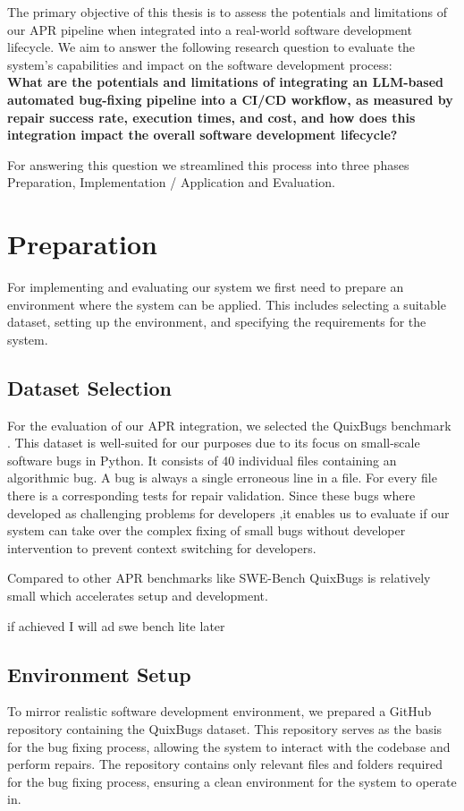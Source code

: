 The primary objective of this thesis is to assess the potentials and limitations of our APR pipeline when integrated into a real-world software development lifecycle. We aim to answer the following research question to evaluate the system's capabilities and impact on the software development process: \\
\textbf{What are the potentials and limitations of integrating an LLM-based automated bug-fixing pipeline into a CI/CD workflow, as measured by repair success rate, execution times, and cost, and how does this integration impact the overall software development lifecycle?}

For answering this question we streamlined this process into three phases Preparation, Implementation / Application and Evaluation.



\section{Preparation}
For implementing and evaluating our system we first need to prepare an environment where the system can be applied. This includes selecting a suitable dataset, setting up the environment, and specifying the requirements for the system.
\subsection{Dataset Selection}
For the evaluation of our APR integration, we selected the QuixBugs benchmark \cite{linQuixBugsMultilingualProgram2017}. This dataset is well-suited for our purposes due to its focus on small-scale software bugs in Python. It consists of 40 individual files containing an algorithmic bug. A bug is always a single erroneous line in a file. For every file there is a corresponding tests for repair validation. Since these bugs where developed as challenging problems for developers \cite{linQuixBugsMultilingualProgram2017},it enables us to evaluate if our system can take over the complex fixing of small bugs without developer intervention to prevent context switching for developers.

Compared to other APR benchmarks like SWE-Bench \cite{jimenezSWEbenchCanLanguage2024} QuixBugs is relatively small which accelerates setup and development.

if achieved I will ad swe bench lite later \cite{jimenezSWEbenchCanLanguage2024}

\subsection{Environment Setup}
To mirror realistic software development environment, we prepared a GitHub repository containing the QuixBugs dataset. This repository serves as the basis for the bug fixing process, allowing the system to interact with the codebase and perform repairs. The repository contains only relevant files and folders required for the bug fixing process, ensuring a clean environment for the system to operate in.

